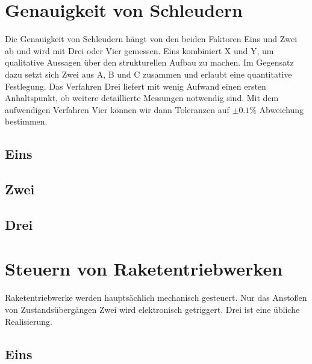 \documentclass[11pt,a4paper]{report}
\begin{document}
\blindtext[1]
\blindtext[2]
\blindtext[1]

\chapter{Genauigkeit von Schleudern} \label{chap:sling}

Die Genauigkeit von Schleudern hängt von den beiden Faktoren
Eins und Zwei ab und wird mit Drei oder Vier gemessen.
Eins kombiniert X und Y, um qualitative Aussagen über den
strukturellen Aufbau zu machen.
Im Gegensatz dazu setzt sich Zwei aus A, B und C zusammen
und erlaubt eine quantitative Festlegung.
Das Verfahren Drei liefert mit wenig Aufwand einen ersten
Anhaltspunkt, ob weitere detaillierte Messungen notwendig sind.
Mit dem aufwendigen Verfahren Vier können wir dann Toleranzen
auf $\pm 0.1\%$ Abweichung bestimmen.

\section{Eins}

\blindtext[3]
\blindtext[1]
\blindtext[2]
\blindtext[3]

\section{Zwei}

\blindtext[1]
\blindtext[2]
\blindtext[4]
\blindtext[2]

\section{Drei}

\blindtext[3]
\blindtext[2]
\blindtext[2]
\blindtext[1]

\chapter{Steuern von Raketentriebwerken} \label{chap:rocket}

Raketentriebwerke werden hauptsächlich mechanisch gesteuert.
Nur das Anstoßen von Zustandsübergängen Zwei wird elektronisch
getriggert. Drei ist eine übliche Realisierung.

\section{Eins}

\blindtext[2]
\blindtext[4]
\blindtext[3]
\blindtext[3]
\blindtext[2]
\end{document}

